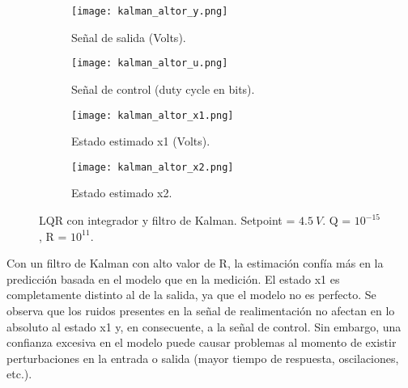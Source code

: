 \begin{figure}[H]
    \centering

    \begin{subfigure}[b]{0.49\textwidth}
        \centering
        \texttt{[image: kalman\_altor\_y.png]}
        \caption{Señal de salida (Volts).}
        \label{fig:kalman_altor_y}
    \end{subfigure}
    \begin{subfigure}[b]{0.49\textwidth}
        \centering
        \texttt{[image: kalman\_altor\_u.png]}
        \caption{Señal de control (duty cycle en bits).}
        \label{fig:kalman_altor_u}
    \end{subfigure}

    \begin{subfigure}[b]{0.49\textwidth}
        \centering
        \texttt{[image: kalman\_altor\_x1.png]}
        \caption{Estado estimado x1 (Volts).}
        \label{fig:kalman_altor_x1}
    \end{subfigure}
    \begin{subfigure}[b]{0.49\textwidth}
        \centering
        \texttt{[image: kalman\_altor\_x2.png]}
        \caption{Estado estimado x2.}
        \label{fig:kalman_altor_x2}
    \end{subfigure}

    \vspace{-0.25cm}
    \caption{LQR con integrador y filtro de Kalman. Setpoint = $4.5\ V$. Q = $10^{-15}$, R = $10^{11}$.}
    \label{fig:kalman_altor}
\end{figure}
\vspace{-0.5cm}

Con un filtro de Kalman con alto valor de R, la estimación confía más en la predicción basada en el modelo que en
la medición. El estado x1 es completamente distinto al de la salida, ya que el modelo no es perfecto. Se observa que los ruidos
presentes en la señal de realimentación no afectan en lo absoluto al estado x1 y, en consecuente, a la señal de control.
Sin embargo, una confianza excesiva en el modelo puede causar problemas al momento de existir perturbaciones en la entrada o salida 
(mayor tiempo de respuesta, oscilaciones, etc.).

